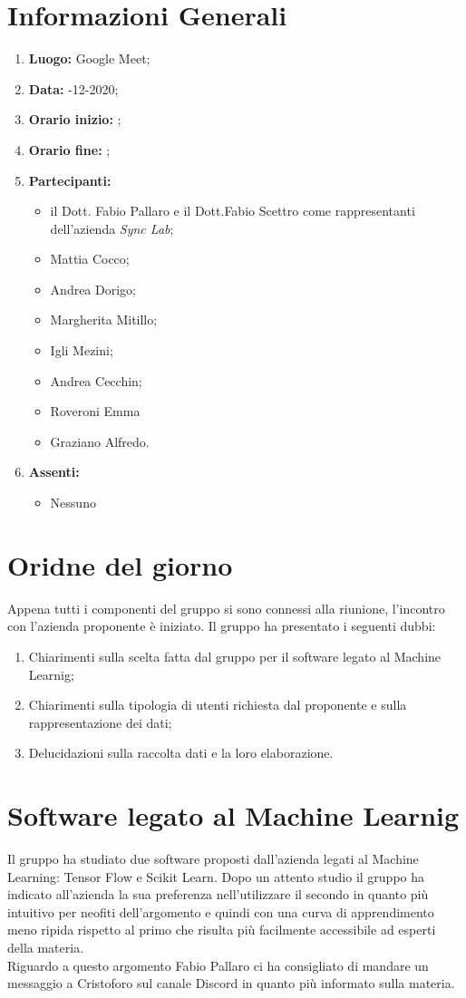 \newpage
\section{Informazioni Generali}
\begin{enumerate}
	\item \textbf{Luogo:} \normalfont Google Meet;
	\item \textbf{Data:} -12-2020;
	\item \textbf{Orario inizio:} ;
	\item \textbf{Orario fine:} ;
	\item \textbf{Partecipanti:}
	\begin{itemize}
		\item il Dott. Fabio Pallaro e il Dott.Fabio Scettro come rappresentanti dell'azienda \textit{Sync Lab};
		\item Mattia Cocco; 
		\item Andrea Dorigo;
		\item Margherita Mitillo;
		\item Igli Mezini;
		\item Andrea Cecchin;
		\item Roveroni Emma
		\item Graziano Alfredo.
	\end{itemize}
	\item \textbf{Assenti:}
	\begin{itemize}
		\item Nessuno
	\end{itemize}
\end{enumerate}
\section{Oridne del giorno}
Appena tutti i componenti del gruppo si sono connessi alla riunione, l'incontro con l'azienda proponente è iniziato. Il gruppo ha presentato i seguenti dubbi:
\begin{enumerate}
	\item Chiarimenti sulla scelta fatta dal gruppo per il software legato al Machine Learnig;
	\item Chiarimenti sulla tipologia di utenti richiesta dal proponente e sulla rappresentazione dei dati;
	\item Delucidazioni sulla raccolta dati e la loro elaborazione.
\end{enumerate}
\section{Software legato al Machine Learnig}
Il gruppo ha studiato due software proposti dall'azienda legati al Machine Learning: Tensor Flow e Scikit Learn.
Dopo un attento studio il gruppo ha indicato all'azienda la sua preferenza nell'utilizzare il secondo in quanto più intuitivo per neofiti dell'argomento e quindi con una curva di apprendimento meno ripida rispetto al primo che risulta più facilmente accessibile ad esperti della materia. \\
Riguardo a questo argomento Fabio Pallaro ci ha consigliato di mandare un messaggio a Cristoforo sul canale Discord in quanto più informato sulla materia.
